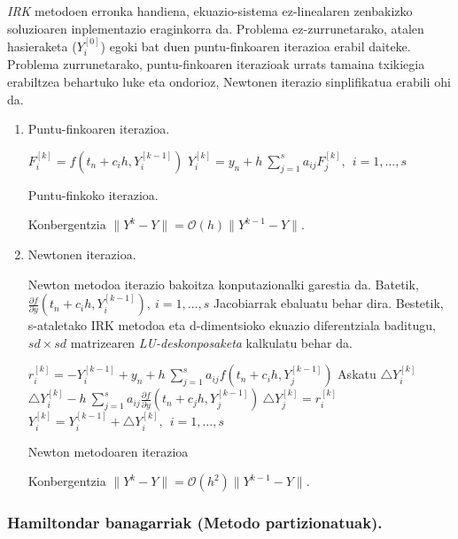 \emph{IRK} metodoen erronka handiena, ekuazio-sistema ez-linealaren zenbakizko soluzioaren inplementazio eraginkorra da. Problema ez-zurrunetarako, atalen hasieraketa ($Y_i^{[0]}$) egoki bat duen puntu-finkoaren iterazioa erabil daiteke. Problema zurrunetarako, puntu-finkoaren iterazioak urrats tamaina txikiegia erabiltzea behartuko luke eta ondorioz, Newtonen iterazio sinplifikatua erabili ohi da.  

\begin{enumerate}

\item Puntu-finkoaren iterazioa.

\begin{algorithm}[H]
  {
   $F_{i}^{[k]}=f(t_n+c_ih,Y_i^{[k-1]})$\;
   $Y_{i}^{[k]}=y_{n}+ h \ \sum\limits_{j=1}^{s} a_{ij} F_{j}^{[k]} , \ \  i=1,\dots,s$\; 
  }
 \caption{Puntu-finkoko iterazioa.}
 \label{alg:rkpf}
\end{algorithm}

Konbergentzia $\|Y^k-Y\|=\mathcal{O}(h) \|Y^{k-1}-Y\|$.


\item Newtonen iterazioa. 

Newton metodoa iterazio bakoitza konputazionalki garestia da. Batetik,  $\frac{\partial f}{\partial y}(t_n+c_ih,Y_i^{[k-1]}), \ i=1,\dots,s$ Jacobiarrak ebaluatu behar dira. Bestetik, s-ataletako IRK metodoa eta  d-dimentsioko ekuazio diferentziala baditugu, $sd \times sd$ matrizearen \emph{LU-deskonposaketa} kalkulatu behar da.    

\begin{algorithm}[H]
  {
   $r_{i}^{[k]}=-Y_i^{[k-1]}+y_n+h \ \sum\limits_{j=1}^{s} a_{ij} f(t_n+c_ih,Y_j^{[k-1]}) $\;
   Askatu $\triangle Y_i^{[k]}$\;
   $\triangle Y_i^{[k]}-h \ \sum\limits_{j=1}^{s} a_{ij} \frac{\partial f}{\partial y}(t_n+c_jh,Y_j^{[k-1]}) \ \triangle Y_j^{[k]}=r_i^{[k]}$\;
   $Y_i^{[k]}=Y_i^{[k-1]}+\triangle Y_i^{[k]}, \ \  i=1,\dots,s$\; 
  }
 \caption{Newton metodoaren iterazioa}
\end{algorithm}

Konbergentzia $\|Y^k-Y\|=\mathcal{O}(h^2) \|Y^{k-1}-Y\|$.

\end{enumerate}

\subsubsection*{Hamiltondar banagarriak (Metodo partizionatuak).}

